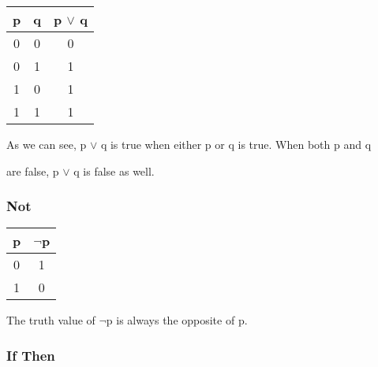 \documentclass{report}
\begin{document}
\begin{center}

  \begin{tabular}{| c | c | c |}

    \hline

    p & q & p $\lor$ q \\ \hline

    0 & 0 & 0 \\

    0 & 1 & 1 \\

    1 & 0 & 1 \\

    1 & 1 & 1 \\ \hline

  \end{tabular}

\end{center}



As we can see, p $\lor$ q is true when either p or q is true. When both p and q

are false, p $\lor$ q is false as well.



\subsubsection{Not}



\begin{center}

  \begin{tabular}{| c | c |}

    \hline

    p & $\neg$p \\ \hline

    0 & 1 \\

    1 & 0 \\ \hline

  \end{tabular}

\end{center}



The truth value of $\neg$p is always the opposite of p.



\subsubsection{If Then}
\end{document}
